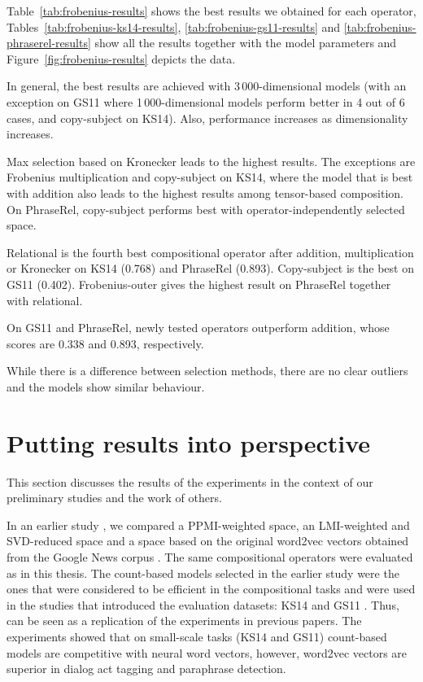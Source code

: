 

Table~\ref{tab:frobenius-results} shows the best results we obtained for each operator, Tables~\ref{tab:frobenius-ks14-results}, \ref{tab:frobenius-gs11-results} and \ref{tab:frobenius-phraserel-results} show all the results together with the model parameters and Figure~\ref{fig:frobenius-results} depicts the data.

In general, the best results are achieved with 3\,000-dimensional models (with an exception on GS11 where 1\,000-dimensional models perform better in 4 out of 6 cases, and copy-subject on KS14). Also, performance increases as dimensionality increases.

Max selection based on Kronecker leads to the highest results. The exceptions are Frobenius multiplication and copy-subject on KS14, where the model that is best with addition also leads to the highest results among tensor-based composition. On PhraseRel, copy-subject performs best with operator-independently selected space.

Relational is the fourth best compositional operator after addition, multiplication or Kronecker on KS14 (0.768) and PhraseRel (0.893). Copy-subject is the best on GS11 (0.402). Frobenius-outer gives the highest result on PhraseRel together with relational.

On GS11 and PhraseRel, newly tested operators outperform addition, whose scores are 0.338 and 0.893, respectively.

While there is a difference between selection methods, there are no clear outliers and the models show similar behaviour.

\section{Putting results into perspective}
\label{sec:comp-with-other}

This section discusses the results of the experiments in the context of our preliminary studies and the work of others.

In an earlier study \cite{milajevs-EtAl:2014:EMNLP2014}, we compared a PPMI-weighted space, an LMI-weighted and SVD-reduced space and a space based on the original word2vec vectors obtained from the Google News corpus \cite{mikolov2013distributed}. The same compositional operators were evaluated as in this thesis. The count-based models selected in the earlier study were the ones that were considered to be efficient in the compositional tasks and were used in the studies that introduced the evaluation datasets: KS14 \cite{kartsadrqpl2014} and GS11 \cite{Grefenstette:2011:ESC:2145432.2145580}. Thus,  can be seen as a replication of the experiments in previous papers. The experiments showed that on small-scale tasks (KS14 and GS11) count-based models are competitive with neural word vectors, however, word2vec vectors are superior in dialog act tagging and paraphrase detection.

